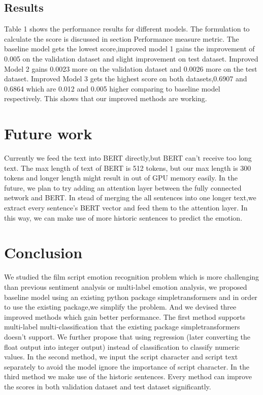 \documentclass[12pt,twocolumn,letterpaper]{article}
\begin{document}
\subsection{Results}


Table 1 shows the performance results for different models. The formulation to calculate the score is discussed in section Performance measure metric. The baseline model gets the lowest score,improved model 1 gains the improvement of  0.005 on the validation dataset and slight improvement on test dataset. Improved Model 2 gains 0.0023 more on the validation dataset and 0.0026 more on the test dataset. Improved Model 3 gets the highest score on both datasets,0.6907 and 0.6864 which are 0.012 and 0.005 higher comparing to baseline model respectively. This shows that our improved methods are working. 




\section{Future work}
 Currently we feed the text into BERT directly,but BERT can't receive too long text. The max length of text of BERT is 512 tokens, but our max length is 300 tokens and longer length might result in out of GPU memory easily.  In the future, we plan to try adding an attention layer between the fully connected network and BERT. In stead of merging the all sentences into one longer text,we extract every sentence's BERT vector and feed them to the attention layer.  In this way, we can make use of more historic sentences to predict the emotion.

\section{Conclusion}
We studied the film script emotion recognition problem which is more challenging than previous sentiment analysis or multi-label emotion analysis, we proposed baseline model using an existing python package simpletransformers and in order to use the existing package,we simplify the problem. And we devised three improved methods which gain better performance. The first method supports multi-label multi-classification that the existing package simpletransformers doesn't support. We further propose that using regression (later converting the float output into integer output) instead of classification to classify numeric values. In the second method, we input the script character and script text separately to avoid the model ignore the importance of script character. In the third method we make use of the historic sentences. Every method can improve the scores in both validation dataset and test dataset significantly. 

  


{\small


}
\end{document}
